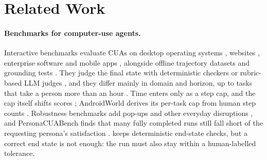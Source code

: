\section{Related Work}
\label{sec:related}

\paragraph{Benchmarks for computer-use agents.} Interactive benchmarks evaluate CUAs on desktop operating systems \citep{xie2024osworld,bonatti2025windowsagentarena,yang2025macosworld,davydova2025osuniverse}, websites \citep{zhou2024webarena,koh2024visualwebarena,he2024webvoyager,xue2025illusion}, enterprise software \citep{drouin2024workarena,boisvert2024workarenapp,xu2024theagentcompany} and mobile apps \citep{rawles2025androidworld}, alongside offline trajectory datasets \citep{deng2023mind2web} and grounding tests \citep{li2025screenspotpro}. They judge the final state with deterministic checkers or rubric-based LLM judges \citep{xue2025illusion,lu2025agentrewardbench}, and they differ mainly in domain and horizon, up to tasks that take a person more than an hour \citep{yuan2026osworld2}. Time enters only as a step cap, and the cap itself shifts scores \citep{xlang2025osworldverified,qin2025uitars,agashe2025agents2}; AndroidWorld derives its per-task cap from human step counts \citep{rawles2025androidworld}. Robustness benchmarks add pop-ups and other everyday disruptions \citep{zhang2025popups,yang2026guirobust}, and PersonaCUABench finds that many fully completed runs still fall short of the requesting persona's satisfaction \citep{li2026personacuabench}. \bench keeps deterministic end-state checks, but a correct end state is not enough: the run must also stay within a human-labelled tolerance.

